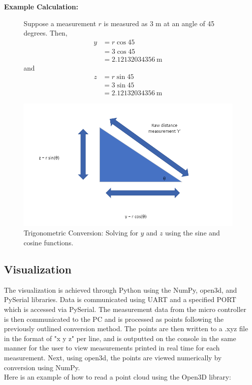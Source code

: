 \documentclass[12pt, letterpaper]{article}
\begin{document}
\textbf{Example Calculation:} 
\begin{figure}[h]
    \centering
    \begin{minipage}{0.5\textwidth}
        Suppose a measurement $r$ is measured as 3 m at an angle of 45 degrees. Then,
        \begin{align*}
            y &= r\cos{45}\\
              &= 3\cos{45}\\
              &= 2.12132034356 \ \text{m}
        \end{align*}
        and 
        \begin{align*}
            z &= r\sin{45}\\
              &= 3\sin{45}\\
              &= 2.12132034356 \ \text{m}
        \end{align*}
    \end{minipage}%
    \begin{minipage}{0.5\textwidth}
        \centering
        \includegraphics[width=\textwidth]{images/triangle.png}
    \end{minipage}
    \caption{Trigonometric Conversion: Solving for $y$ and $z$ using the sine and cosine functions.}
    \label{fig:trig_conversion}
\end{figure}

\subsection{Visualization}
The visualization is achieved through Python using the NumPy, open3d, and PySerial libraries. Data is communicated using UART and a specified PORT which is accessed via PySerial. The measurement data from the micro controller is then communicated to the PC and is processed as points following the previously outlined conversion method. The points are then written to a .xyz file in the format of "x y z" per line, and is outputted on the console in the same manner for the user to view measurements printed in real time for each measurement. Next, using open3d, the points are viewed numerically by conversion using NumPy. 
\\Here is an example of how to read a point cloud using the Open3D library:
\end{document}
